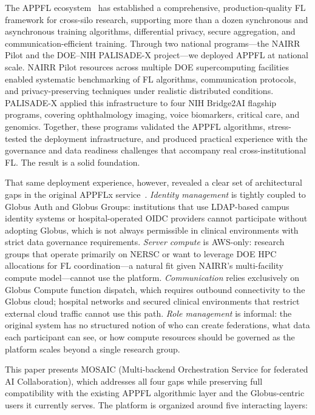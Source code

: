 \documentclass[conference]{IEEEtran}
\begin{document}
The APPFL ecosystem~\cite{ryu2022appfl, li2025advances} has
established a comprehensive, production-quality FL framework for
cross-silo research, supporting more than a dozen synchronous and
asynchronous training algorithms, differential privacy, secure
aggregation, and communication-efficient training. Through two
national programs---the NAIRR Pilot and the DOE--NIH PALISADE-X
project---we deployed APPFL at national scale. NAIRR Pilot resources
across multiple DOE supercomputing facilities enabled systematic
benchmarking of FL algorithms, communication protocols, and
privacy-preserving techniques under realistic distributed conditions.
PALISADE-X applied this infrastructure to four NIH Bridge2AI flagship
programs, covering ophthalmology imaging, voice biomarkers, critical
care, and genomics. Together, these programs validated the APPFL
algorithms, stress-tested the deployment infrastructure, and produced
practical experience with the governance and data readiness challenges
that accompany real cross-institutional FL. The result is a solid
foundation.

That same deployment experience, however, revealed a clear set of
architectural gaps in the original APPFLx service~\cite{li2023appflx}.
\textit{Identity management} is tightly coupled to Globus Auth and
Globus Groups: institutions that use LDAP-based campus identity systems
or hospital-operated OIDC providers cannot participate without adopting
Globus, which is not always permissible in clinical environments with
strict data governance requirements.
\textit{Server compute} is AWS-only: research groups that operate
primarily on NERSC or want to leverage DOE HPC allocations for FL
coordination---a natural fit given NAIRR's multi-facility compute
model---cannot use the platform.
\textit{Communication} relies exclusively on Globus Compute function
dispatch, which requires outbound connectivity to the Globus cloud;
hospital networks and secured clinical environments that restrict
external cloud traffic cannot use this path.
\textit{Role management} is informal: the original system has no
structured notion of who can create federations, what data each
participant can see, or how compute resources should be governed as
the platform scales beyond a single research group.

This paper presents MOSAIC (Multi-backend Orchestration Service for
federated AI Collaboration), which addresses all four gaps while
preserving full compatibility with the existing APPFL algorithmic
layer and the Globus-centric users it currently serves. The platform is organized around five interacting layers:
\end{document}
